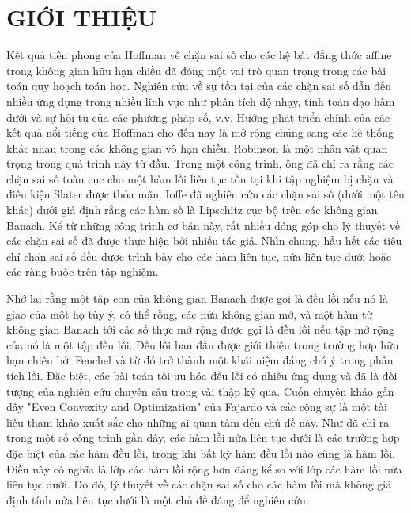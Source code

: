 \chapter{GIỚI THIỆU}

Kết quả tiên phong của Hoffman về chặn sai số cho các hệ bất đẳng thức affine trong không gian hữu hạn chiều đã đóng một vai trò quan trọng trong các bài toán quy hoạch toán học. Nghiên cứu về sự tồn tại của các chặn sai số dẫn đến nhiều ứng dụng trong nhiều lĩnh vực như phân tích độ nhạy, tính toán đạo hàm dưới và sự hội tụ của các phương pháp số, v.v. Hướng phát triển chính của các kết quả nổi tiếng của Hoffman cho đến nay là mở rộng chúng sang các hệ thống khác nhau trong các không gian vô hạn chiều. Robinson là một nhân vật quan trọng trong quá trình này từ đầu. Trong một công trình, ông đã chỉ ra rằng các chặn sai số toàn cục cho một hàm lồi liên tục tồn tại khi tập nghiệm bị chặn và điều kiện Slater được thỏa mãn. Ioffe đã nghiên cứu các chặn sai số (dưới một tên khác) dưới giả định rằng các hàm số là Lipschitz cục bộ trên các không gian Banach. Kể từ những công trình cơ bản này, rất nhiều đóng góp cho lý thuyết về các chặn sai số đã được thực hiện bởi nhiều tác giả. Nhìn chung, hầu hết các tiêu chí chặn sai số đều được trình bày cho các hàm liên tục, nửa liên tục dưới hoặc các ràng buộc trên tập nghiệm.

Nhớ lại rằng một tập con của không gian Banach được gọi là đều lồi nếu nó là giao của một họ tùy ý, có thể rỗng, các nửa không gian mở, và một hàm từ không gian Banach tới các số thực mở rộng được gọi là đều lồi nếu tập mở rộng của nó là một tập đều lồi. Đều lồi ban đầu được giới thiệu trong trường hợp hữu hạn chiều bởi Fenchel và từ đó trở thành một khái niệm đáng chú ý trong phân tích lồi. Đặc biệt, các bài toán tối ưu hóa đều lồi có nhiều ứng dụng và đã là đối tượng của nghiên cứu chuyên sâu trong vài thập kỷ qua. Cuốn chuyên khảo gần đây "Even Convexity and Optimization" của Fajardo và các cộng sự là một tài liệu tham khảo xuất sắc cho những ai quan tâm đến chủ đề này. Như đã chỉ ra trong một số công trình gần đây, các hàm lồi nửa liên tục dưới là các trường hợp đặc biệt của các hàm đều lồi, trong khi bất kỳ hàm đều lồi nào cũng là hàm lồi. Điều này có nghĩa là lớp các hàm lồi rộng hơn đáng kể so với lớp các hàm lồi nửa liên tục dưới. Do đó, lý thuyết về các chặn sai số cho các hàm lồi mà không giả định tính nửa liên tục dưới là một chủ đề đáng để nghiên cứu.


